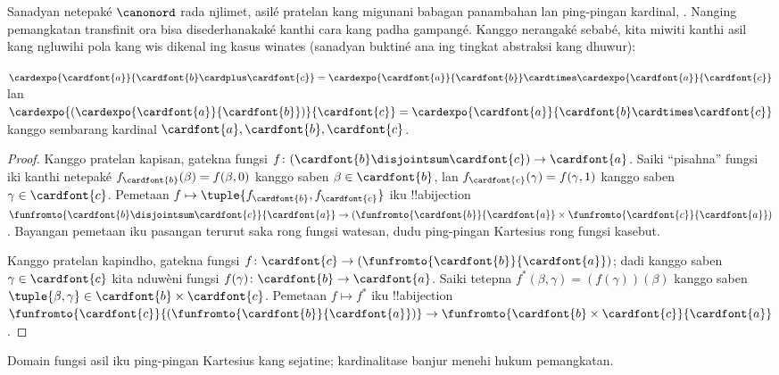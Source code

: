 \documentclass[../../../include/open-logic-section]{subfiles}
\begin{document}


Sanadyan netepaké $\canonord$ rada njlimet, asilé
pratelan kang migunani babagan panambahan lan ping-pingan
kardinal, . Nanging pemangkatan
transfinit ora bisa disederhanakaké kanthi cara kang padha
gampangé. Kanggo nerangaké sebabé, kita miwiti kanthi asil
kang ngluwihi pola kang wis dikenal ing kasus winates
(sanadyan buktiné ana ing tingkat abstraksi kang dhuwur):

\begin{prop}
$\cardexpo{\cardfont{a}}{\cardfont{b} \cardplus \cardfont{c}} =
\cardexpo{\cardfont{a}}{\cardfont{b}} \cardtimes
\cardexpo{\cardfont{a}}{\cardfont{c}}$ lan
$\cardexpo{(\cardexpo{\cardfont{a}}{\cardfont{b}})}{\cardfont{c}} =
\cardexpo{\cardfont{a}}{\cardfont{b} \cardtimes \cardfont{c}}$ kanggo
sembarang kardinal $\cardfont{a}, \cardfont{b}, \cardfont{c}$.
\end{prop}

\begin{proof}
Kanggo pratelan kapisan, gatekna fungsi $f \colon
(\cardfont{b}\disjointsum\cardfont{c}) \to \cardfont{a}$.
Saiki “pisahna” fungsi iki kanthi netepaké
$f_\cardfont{b}(\beta) = f(\beta, 0)$ kanggo saben
$\beta \in \cardfont{b}$, lan $f_\cardfont{c}(\gamma) = f(\gamma, 1)$
kanggo saben $\gamma \in \cardfont{c}$. Pemetaan $f \mapsto
\tuple{f_{\cardfont{b}}, f_\cardfont{c}}$ iku !!a{bijection}
$\funfromto{\cardfont{b} \disjointsum \cardfont{c}}{\cardfont{a}} \to
(\funfromto{\cardfont{b}}{\cardfont{a}} \times
\funfromto{\cardfont{c}}{\cardfont{a}})$.
Bayangan pemetaan iku pasangan terurut saka rong fungsi watesan, dudu ping-pingan Kartesius rong fungsi kasebut.

Kanggo pratelan kapindho, gatekna fungsi $f \colon \cardfont{c} \to
(\funfromto{\cardfont{b}}{\cardfont{a}})$; dadi kanggo saben $\gamma \in
\cardfont{c}$ kita nduwèni fungsi $f(\gamma) \colon \cardfont{b} \to
\cardfont{a}$. Saiki tetepna $f^*(\beta, \gamma) = (f(\gamma))(\beta)$
kanggo saben $\tuple{\beta, \gamma} \in \cardfont{b} \times \cardfont{c}$.
Pemetaan $f \mapsto f^*$ iku !!a{bijection}
$\funfromto{\cardfont{c}}{(\funfromto{\cardfont{b}}{\cardfont{a}})}
\to \funfromto{\cardfont{b} \times \cardfont{c}}{\cardfont{a}}$.
\end{proof}
Domain fungsi asil iku ping-pingan Kartesius kang sejatine; kardinalitase banjur menehi hukum pemangkatan.
\end{document}
